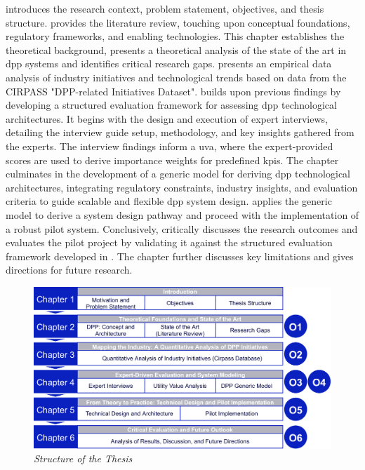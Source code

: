  introduces the research context, problem statement, objectives, and thesis structure.  provides the literature review, touching upon conceptual foundations, regulatory frameworks, and enabling technologies. This chapter establishes the theoretical background, presents a theoretical analysis of the state of the art in \ac{dpp} systems and identifies critical research gaps.   presents an empirical data analysis of industry initiatives and technological trends based on data from the CIRPASS "DPP-related Initiatives Dataset".  builds upon previous findings by developing a structured evaluation framework for assessing \ac{dpp} technological architectures. It begins with the design and execution of expert interviews, detailing the interview guide setup, methodology, and key insights gathered from the experts. The interview findings inform a \acrlong{uva}, where the expert-provided scores are used to derive importance weights for predefined \ac{kpi}s. The chapter culminates in the development of a generic model for deriving \ac{dpp} technological architectures, integrating regulatory constraints, industry insights, and evaluation criteria to guide scalable and flexible \ac{dpp} system design.  applies the generic model to derive a system design pathway and proceed with the implementation of a robust pilot system. Conclusively,  critically discusses the research outcomes and evaluates the pilot project by validating it against the structured evaluation framework developed in . The chapter further discusses key limitations and gives directions for future research.

\begin{figure}[htbp]
  \centering
  \includegraphics[width=\textwidth]{figures/thesis_structure.pdf}
  \caption{%
    \textit{Structure of the Thesis} 
  }
  \label{fig:thesis_structure}
\end{figure}